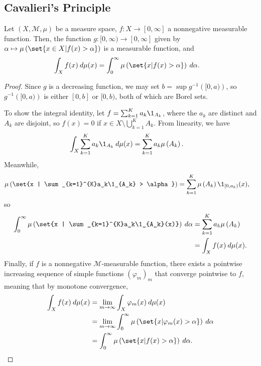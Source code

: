 \documentclass[10pt]{mypackage}
\begin{document}
\subsection{Cavalieri's Principle}%
\begin{theorem}
  Let $ \left(X, \mathcal{M}, \mu\right) $ be a measure space, $f\colon X\rightarrow [0,\infty]$ a nonnegative measurable function. Then, the function $g\colon [0,\infty)\rightarrow [0,\infty]$ given by $\alpha \mapsto \mu\left(\set{x\in X | f(x) > \alpha}\right)$ is a measurable function, and
  \begin{align*}
    \int_{X}^{} f(x)\:d\mu(x) &= \int_{0}^{\infty} \mu\left(\set{x | f(x) > \alpha}\right)\:d\alpha.
  \end{align*}
\end{theorem}
\begin{proof}
  Since $g$ is a decreasing function, we may set $b = \sup g^{-1}\left([0,a)\right)$, so $g^{-1}\left([0,a)\right)$ is either $[0,b]$ or $[0,b)$, both of which are Borel sets.\newline

  To show the integral identity, let $f = \sum_{k=1}^{K}a_k\1_{A_k}$, where the $a_k$ are distinct and $A_k$ are disjoint, so $f(x) = 0$ if $x\in X \setminus \bigcup_{k=1}^{K}A_k$. From linearity, we have
  \begin{align*}
    \int_{X}^{} \sum_{k=1}^{K}a_k\1_{A_k}\:d\mu(x) &= \sum_{k=1}^{K} a_k\mu\left(A_k\right).
  \end{align*}
  Meanwhile,
  \begin{align*}
    \mu\left(\set{x | \sum_{k=1}^{K}a_k\1_{A_k} > \alpha}\right) &= \sum_{k=1}^{K} \mu\left(A_k\right)\1_{[0,a_k)}(x),
  \end{align*}
  so
  \begin{align*}
    \int_{0}^{\infty} \mu\left(\set{x | \sum_{k=1}^{K}a_k\1_{A_k}(x)}\right)\:d\alpha &= \sum_{k=1}^{K}a_k\mu\left(A_k\right)\\
                                                                                      &= \int_{X}^{} f(x)\:d\mu(x).
  \end{align*}
  Finally, if $f$ is a nonnegative $\mathcal{M}$-measurable function, there exists a pointwise increasing sequence of simple functions $\left(\varphi_m\right)_m$ that converge pointwise to $f$, meaning that by monotone convergence,
  \begin{align*}
    \int_{X}^{} f(x)\:d\mu(x) &= \lim_{m\rightarrow\infty} \int_{X}^{} \varphi_m(x)\:d\mu(x)\\
                              &= \lim_{m\rightarrow\infty} \int_{0}^{\infty} \mu\left(\set{x | \varphi_m(x) > \alpha}\right)\:d\alpha\\
                              &= \int_{0}^{\infty} \mu\left(\set{x | f(x) > \alpha}\right)\:d\alpha.
  \end{align*}
\end{proof}
\end{document}
